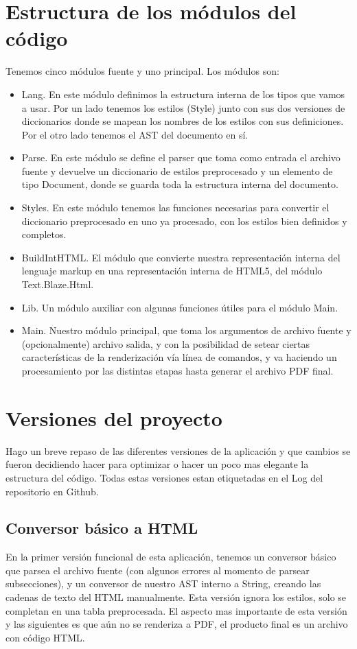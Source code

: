 \documentclass{article}
\begin{document}
\section{Estructura de los módulos del código}

Tenemos cinco módulos fuente y uno principal. Los módulos son:
\begin{itemize}
    \item Lang. En este módulo definimos la estructura interna de los tipos que vamos a usar. Por un lado tenemos los estilos (Style) junto con sus dos versiones de diccionarios donde se mapean los nombres de los estilos con sus definiciones. Por el otro lado tenemos el AST del documento en sí.
    \item Parse. En este módulo se define el parser que toma como entrada el archivo fuente y devuelve un diccionario de estilos preprocesado y un elemento de tipo Document, donde se guarda toda la estructura interna del documento.
    \item Styles. En este módulo tenemos las funciones necesarias para convertir el diccionario preprocesado en uno ya procesado, con los estilos bien definidos y completos.
    \item BuildIntHTML. El módulo que convierte nuestra representación interna del lenguaje markup en una representación interna de HTML5, del módulo Text.Blaze.Html.
    \item Lib. Un módulo auxiliar con algunas funciones útiles para el módulo Main.
    \item Main. Nuestro módulo principal, que toma los argumentos de archivo fuente y (opcionalmente) archivo salida, y con la posibilidad de setear ciertas características de la renderización vía línea de comandos, y va haciendo un procesamiento por las distintas etapas hasta generar el archivo PDF final.
\end{itemize}

\section{Versiones del proyecto}

Hago un breve repaso de las diferentes versiones de la aplicación y que cambios se fueron decidiendo hacer para optimizar o hacer un poco mas elegante la estructura del código. Todas estas versiones estan etiquetadas en el Log del repositorio en Github.

\subsection{Conversor básico a HTML}
En la primer versión funcional de esta aplicación, tenemos un conversor básico que parsea el archivo fuente (con algunos errores al momento de parsear subsecciones), y un conversor de nuestro AST interno a String, creando las cadenas de texto del HTML manualmente. Esta versión ignora los estilos, solo se completan en una tabla preprocesada. El aspecto mas importante de esta versión y las siguientes es que aún no se renderiza a PDF, el producto final es un archivo con código HTML.
\end{document}
